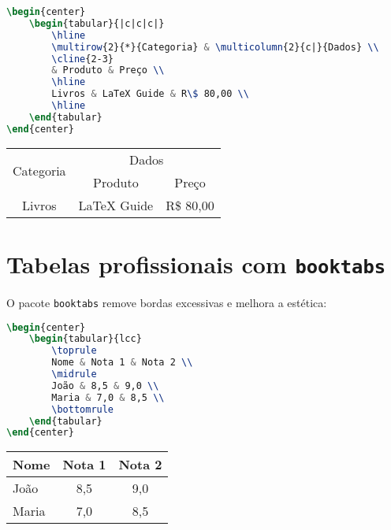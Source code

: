 \begin{lstlisting}[language=tex, caption=Exemplo de mesclagem]
\begin{center}
    \begin{tabular}{|c|c|c|}
        \hline
        \multirow{2}{*}{Categoria} & \multicolumn{2}{c|}{Dados} \\ 
        \cline{2-3}
        & Produto & Preço \\ 
        \hline
        Livros & LaTeX Guide & R\$ 80,00 \\ 
        \hline
    \end{tabular}
\end{center}
\end{lstlisting}

\begin{center}
    \begin{tabular}{|c|c|c|}
        \hline
        \multirow{2}{*}{Categoria} & \multicolumn{2}{c|}{Dados} \\ 
        \cline{2-3}
        & Produto & Preço \\ 
        \hline
        Livros & LaTeX Guide & R\$ 80,00 \\ 
        \hline
    \end{tabular}
\end{center}

\section{Tabelas profissionais com \texttt{booktabs}}

O pacote \verb|booktabs| remove bordas excessivas e melhora a estética:

\begin{lstlisting}[language=tex, caption=Exemplo de mesclagem]
\begin{center}
    \begin{tabular}{lcc}
        \toprule
        Nome & Nota 1 & Nota 2 \\ 
        \midrule
        João & 8,5 & 9,0 \\ 
        Maria & 7,0 & 8,5 \\ 
        \bottomrule
    \end{tabular}
\end{center}
\end{lstlisting}

\begin{center}
    \begin{tabular}{lcc}
        \toprule
        Nome & Nota 1 & Nota 2 \\ 
        \midrule
        João & 8,5 & 9,0 \\ 
        Maria & 7,0 & 8,5 \\ 
        \bottomrule
    \end{tabular}
\end{center}

